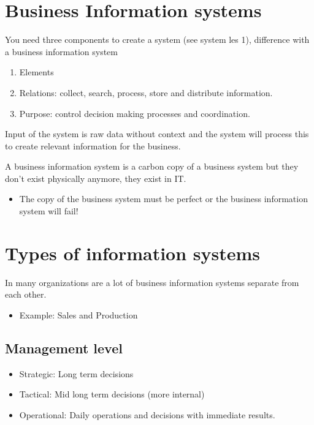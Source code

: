 \documentclass{article}
\begin{document}
\section{Business Information systems}

You need three components to create a system (see system les 1), difference with a business information system

\begin{enumerate}
\item  Elements

\item  Relations: collect, search, process, store and distribute information.

\item  Purpose: control decision making processes and coordination.
\end{enumerate}

Input of the system is raw data without context and the system will process this to create relevant information for the business.

\hfill \newline A business information system is a carbon copy of a business system but they don't exist physically anymore, they exist in IT.

\begin{itemize}
\item  The copy of the business system must be perfect or the business information system will fail!
\end{itemize}

\section{Types of information systems}

In many organizations are a lot of business information systems separate from each other. 

\begin{itemize}
\item  Example: Sales and Production
\end{itemize}

\subsection{Management level}

\begin{itemize}
\item  Strategic: Long term decisions

\item  Tactical: Mid long term decisions (more internal)

\item  Operational: Daily operations and decisions with immediate results.
\end{itemize}
\end{document}
